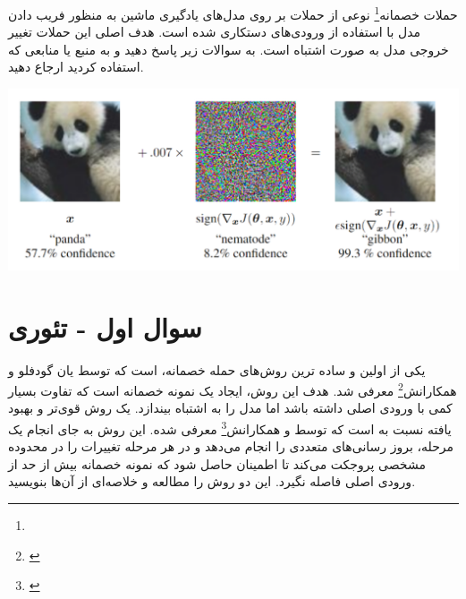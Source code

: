حملات خصمانه\footnote{} نوعی از حملات بر روی مدل‌های یادگیری ماشین به منظور فریب دادن مدل با استفاده از ورودی‌های دستکاری شده است. هدف اصلی این حملات تغییر خروجی مدل به صورت اشتباه است. به سوالات زیر پاسخ دهید و به منبع یا منابعی که استفاده کردید ارجاع دهید.


\begin{center}
	\includegraphics*[width=0.8\linewidth]{pics/img1.png}
	\label{تغییر نمونه ورودی}
\end{center}


\section{سوال اول - تئوری}
یکی از اولین و ساده ترین روش‌های حمله خصمانه،  است که توسط یان گودفلو و همکارانش\footnote{‬‬} معرفی شد. هدف این روش، ایجاد یک نمونه خصمانه است که تفاوت بسیار کمی با ورودی اصلی داشته باشد اما مدل را به اشتباه بیندازد.  یک روش قوی‌تر و بهبود یافته نسبت به  است که توسط  و همکارانش\footnote{‫‪‬‬} معرفی شده. این روش به جای انجام یک مرحله، بروز رسانی‌های متعددی را انجام می‌دهد و در هر مرحله تغییرات را در محدوده مشخصی پروجکت می‌کند تا اطمینان حاصل شود که نمونه خصمانه بیش از حد از ورودی اصلی فاصله نگیرد. این دو روش را مطالعه و خلاصه‌ای از آن‌ها بنویسید.


\begin{qsolve}
	
\end{qsolve}












































